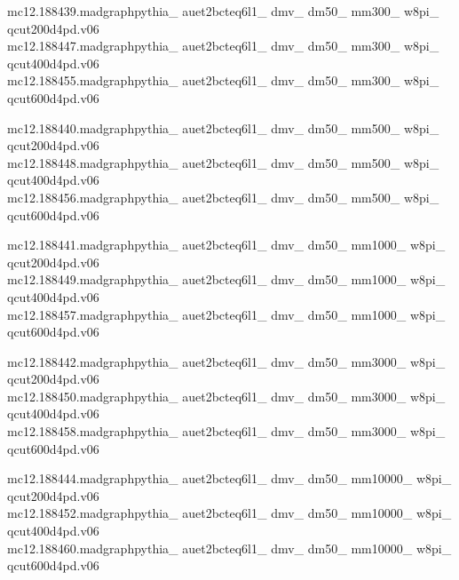 mc12.188439.madgraphpythia\_ auet2bcteq6l1\_ dmv\_ dm50\_ mm300\_ w8pi\_ \\ qcut200d4pd.v06\\
mc12.188447.madgraphpythia\_ auet2bcteq6l1\_ dmv\_ dm50\_ mm300\_ w8pi\_ \\ qcut400d4pd.v06\\
mc12.188455.madgraphpythia\_ auet2bcteq6l1\_ dmv\_ dm50\_ mm300\_ w8pi\_ \\ qcut600d4pd.v06

mc12.188440.madgraphpythia\_ auet2bcteq6l1\_ dmv\_ dm50\_ mm500\_ w8pi\_ \\ qcut200d4pd.v06\\
mc12.188448.madgraphpythia\_ auet2bcteq6l1\_ dmv\_ dm50\_ mm500\_ w8pi\_ \\ qcut400d4pd.v06\\
mc12.188456.madgraphpythia\_ auet2bcteq6l1\_ dmv\_ dm50\_ mm500\_ w8pi\_ \\ qcut600d4pd.v06

mc12.188441.madgraphpythia\_ auet2bcteq6l1\_ dmv\_ dm50\_ mm1000\_ w8pi\_ \\ qcut200d4pd.v06\\
mc12.188449.madgraphpythia\_ auet2bcteq6l1\_ dmv\_ dm50\_ mm1000\_ w8pi\_ \\ qcut400d4pd.v06\\
mc12.188457.madgraphpythia\_ auet2bcteq6l1\_ dmv\_ dm50\_ mm1000\_ w8pi\_ \\ qcut600d4pd.v06

mc12.188442.madgraphpythia\_ auet2bcteq6l1\_ dmv\_ dm50\_ mm3000\_ w8pi\_ \\ qcut200d4pd.v06\\
mc12.188450.madgraphpythia\_ auet2bcteq6l1\_ dmv\_ dm50\_ mm3000\_ w8pi\_ \\ qcut400d4pd.v06\\
mc12.188458.madgraphpythia\_ auet2bcteq6l1\_ dmv\_ dm50\_ mm3000\_ w8pi\_ \\ qcut600d4pd.v06

mc12.188444.madgraphpythia\_ auet2bcteq6l1\_ dmv\_ dm50\_ mm10000\_ w8pi\_ \\ qcut200d4pd.v06\\
mc12.188452.madgraphpythia\_ auet2bcteq6l1\_ dmv\_ dm50\_ mm10000\_ w8pi\_ \\ qcut400d4pd.v06\\
mc12.188460.madgraphpythia\_ auet2bcteq6l1\_ dmv\_ dm50\_ mm10000\_ w8pi\_ \\ qcut600d4pd.v06

